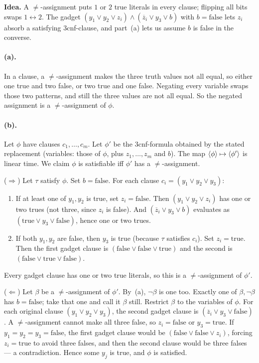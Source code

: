 \begin{soln}
\textbf{Idea.} A $\neq$-assignment puts $1$ or $2$ true literals in every clause; flipping all bits swaps $1\leftrightarrow 2$. The gadget $(y_1\lor y_2\lor z_i)\land(\overline{z}_i\lor y_3\lor b)$ with $b=\mathrm{false}$ lets $z_i$ absorb a satisfying $3$cnf-clause, and part~(a) lets us assume $b$ is false in the converse.

\paragraph{(a).}
In a clause, a $\neq$-assignment makes the three truth values not all equal, so either one true and two false, or two true and one false. Negating every variable swaps those two patterns, and still the three values are not all equal. So the negated assignment is a $\neq$-assignment of $\phi$.

\paragraph{(b).}
Let $\phi$ have clauses $c_1,\dots,c_m$. Let $\phi'$ be the $3$cnf-formula obtained by the stated replacement (variables: those of $\phi$, plus $z_1,\dots,z_m$ and $b$). The map $\langle \phi\rangle\mapsto\langle \phi'\rangle$ is linear time. We claim $\phi$ is satisfiable iff $\phi'$ has a $\neq$-assignment.

($\Rightarrow$) Let $\tau$ satisfy $\phi$. Set $b=\mathrm{false}$. For each clause $c_i=(y_1\lor y_2\lor y_3)$:
\begin{enumerate}
\item If at least one of $y_1,y_2$ is true, set $z_i=\mathrm{false}$. Then $(y_1\lor y_2\lor z_i)$ has one or two trues (not three, since $z_i$ is false). And $(\overline{z}_i\lor y_3\lor b)$ evaluates as $(\mathrm{true}\lor y_3\lor\mathrm{false})$, hence one or two trues.
\item If both $y_1,y_2$ are false, then $y_3$ is true (because $\tau$ satisfies $c_i$). Set $z_i=\mathrm{true}$. Then the first gadget clause is $(\mathrm{false}\lor\mathrm{false}\lor\mathrm{true})$ and the second is $(\mathrm{false}\lor\mathrm{true}\lor\mathrm{false})$.
\end{enumerate}
Every gadget clause has one or two true literals, so this is a $\neq$-assignment of $\phi'$.

($\Leftarrow$) Let $\beta$ be a $\neq$-assignment of $\phi'$. By~(a), $\neg\beta$ is one too. Exactly one of $\beta,\neg\beta$ has $b=\mathrm{false}$; take that one and call it $\beta$ still. Restrict $\beta$ to the variables of $\phi$. For each original clause $(y_1\lor y_2\lor y_3)$, the second gadget clause is $(\overline{z}_i\lor y_3\lor\mathrm{false})$. A $\neq$-assignment cannot make all three false, so $z_i=\mathrm{false}$ or $y_3=\mathrm{true}$. If $y_1=y_2=y_3=\mathrm{false}$, the first gadget clause would be $(\mathrm{false}\lor\mathrm{false}\lor z_i)$, forcing $z_i=\mathrm{true}$ to avoid three falses, and then the second clause would be three falses --- a contradiction. Hence some $y_j$ is true, and $\phi$ is satisfied.


\end{soln}
